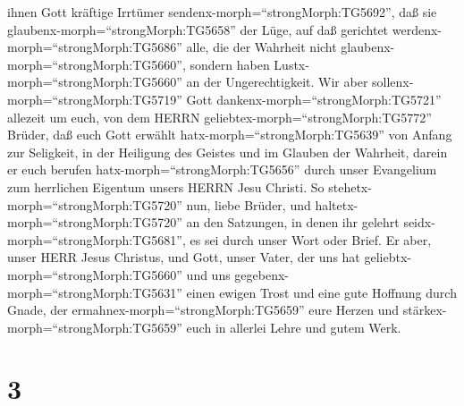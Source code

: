 ihnen Gott kräftige Irrtümer sendenx-morph=``strongMorph:TG5692'', daß
sie glaubenx-morph=``strongMorph:TG5658'' der Lüge,  auf
daß gerichtet werdenx-morph=``strongMorph:TG5686'' alle, die der
Wahrheit nicht glaubenx-morph=``strongMorph:TG5660'', sondern haben
Lustx-morph=``strongMorph:TG5660'' an der Ungerechtigkeit. 
Wir aber sollenx-morph=``strongMorph:TG5719'' Gott
dankenx-morph=``strongMorph:TG5721'' allezeit um euch, von dem HERRN
geliebtex-morph=``strongMorph:TG5772'' Brüder, daß euch Gott erwählt
hatx-morph=``strongMorph:TG5639'' von Anfang zur Seligkeit, in der
Heiligung des Geistes und im Glauben der Wahrheit,  darein
er euch berufen hatx-morph=``strongMorph:TG5656'' durch unser Evangelium
zum herrlichen Eigentum unsers HERRN Jesu Christi.  So
stehetx-morph=``strongMorph:TG5720'' nun, liebe Brüder, und
haltetx-morph=``strongMorph:TG5720'' an den Satzungen, in denen ihr
gelehrt seidx-morph=``strongMorph:TG5681'', es sei durch unser Wort oder
Brief.  Er aber, unser HERR Jesus Christus, und Gott, unser
Vater, der uns hat geliebtx-morph=``strongMorph:TG5660'' und uns
gegebenx-morph=``strongMorph:TG5631'' einen ewigen Trost und eine gute
Hoffnung durch Gnade,  der
ermahnex-morph=``strongMorph:TG5659'' eure Herzen und
stärkex-morph=``strongMorph:TG5659'' euch in allerlei Lehre und gutem
Werk.

\hypertarget{section-2}{%
\section{3}\label{section-2}}

